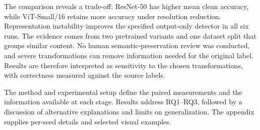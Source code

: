 The comparison reveals a trade-off: ResNet-50 has higher mean clean accuracy, while ViT-Small/16 retains more accuracy under resolution reduction. Representation instability improves the specified output-only detector in all six runs. The evidence comes from two pretrained variants and one dataset split that groups similar content. No human semantic-preservation review was conducted, and severe transformations can remove information needed for the original label. Results are therefore interpreted as sensitivity to the chosen transformations, with correctness measured against the source labels.

The method and experimental setup define the paired measurements and the information available at each stage. Results address RQ1--RQ3, followed by a discussion of alternative explanations and limits on generalization. The appendix supplies per-seed details and selected visual examples.
